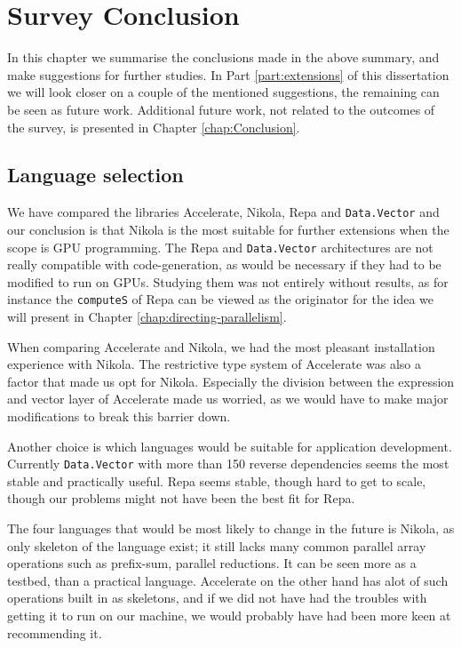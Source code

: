 \chapter{Survey Conclusion}
In this chapter we summarise the conclusions made in the above
summary, and make suggestions for further studies. In Part
\ref{part:extensions} of this dissertation we will look closer on a
couple of the mentioned suggestions, the remaining can be seen as
future work. Additional future work, not related to the outcomes of
the survey, is presented in Chapter \ref{chap:Conclusion}.

\section{Language selection}
We have compared the libraries Accelerate, Nikola, Repa and
\texttt{Data.Vector} and our conclusion is that Nikola is the most
suitable for further extensions when the scope is GPU programming. The
Repa and \texttt{Data.Vector} architectures are not really compatible
with code-generation, as would be necessary if they had to be modified
to run on GPUs. Studying them was not entirely without results, as for
instance the \texttt{computeS} of Repa can be viewed as the originator
for the idea we will present in Chapter
\ref{chap:directing-parallelism}.

When comparing Accelerate and Nikola, we had the most pleasant
installation experience with Nikola. The restrictive type system of
Accelerate was also a factor that made us opt for Nikola. Especially
the division between the expression and vector layer of Accelerate
made us worried, as we would have to make major modifications to break
this barrier down.

Another choice is which languages would be suitable for application
development. Currently \texttt{Data.Vector} with more than 150 reverse
dependencies seems the most stable and practically useful. Repa seems
stable, though hard to get to scale, though our problems might not
have been the best fit for Repa.

The four languages that would be most likely to change in the future
is Nikola, as only skeleton of the language exist; it still lacks many
common parallel array operations such as prefix-sum, parallel
reductions. It can be seen more as a testbed, than a practical
language. Accelerate on the other hand has alot of such operations
built in as skeletons, and if we did not have had the troubles with
getting it to run on our machine, we would probably have had been more
keen at recommending it.

